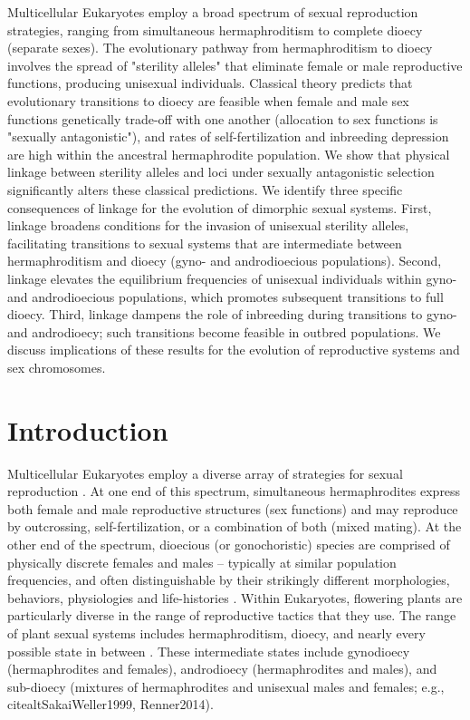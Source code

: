 \documentclass{article}
\begin{document}
\noindent{} Multicellular Eukaryotes employ a broad spectrum of sexual reproduction strategies, ranging from simultaneous hermaphroditism to complete dioecy (separate sexes). The evolutionary pathway from hermaphroditism to dioecy involves the spread of "sterility alleles" that eliminate female or male reproductive functions, producing unisexual individuals. Classical theory predicts that evolutionary transitions to dioecy are feasible when female and male sex functions genetically trade-off with one another (allocation to sex functions is "sexually antagonistic"), and rates of self-fertilization and inbreeding depression are high within the ancestral hermaphrodite population. We show that physical linkage between sterility alleles and loci under sexually antagonistic selection significantly alters these classical predictions. We identify three specific consequences of linkage for the evolution of dimorphic sexual systems. First, linkage broadens conditions for the invasion of unisexual sterility alleles, facilitating transitions to sexual systems that are intermediate between hermaphroditism and dioecy (gyno- and androdioecious populations). Second, linkage elevates the equilibrium frequencies of unisexual individuals within gyno- and androdioecious populations, which promotes subsequent transitions to full dioecy. Third, linkage dampens the role of inbreeding during transitions to gyno- and androdioecy; such transitions become feasible in outbred populations. We discuss implications of these results for the evolution of reproductive systems and sex chromosomes.
\newpage{}


\section*{Introduction}
Multicellular Eukaryotes employ a diverse array of strategies for sexual reproduction \citep{Bachtrog2014}. At one end of this spectrum, simultaneous hermaphrodites express both female and male reproductive structures (sex functions) and may reproduce by outcrossing, self-fertilization, or a combination of both (mixed mating). At the other end of the spectrum, dioecious (or gonochoristic) species are comprised of physically discrete females and males -- typically at similar population frequencies, and often distinguishable by their strikingly different morphologies, behaviors, physiologies and life-histories \citep{Andersson1994}. Within Eukaryotes, flowering plants are particularly diverse in the range of reproductive tactics that they use. The range of plant sexual systems includes hermaphroditism, dioecy, and nearly every possible state in between \citep{Darwin1877, Westergaard1958, Bawa1980, SakaiWeller1999, Bachtrog2014}. These intermediate states include gynodioecy (hermaphrodites and females), androdioecy (hermaphrodites and males), and sub-dioecy (mixtures of hermaphrodites and unisexual males and females; e.g., citealt{SakaiWeller1999, Renner2014}). 
\end{document}
